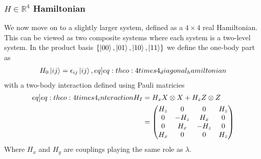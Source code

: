 \subsubsection{$H \in \mathbb{R}^4$ Hamiltonian}
We now move on to a slightly larger system, defined as a $4 \times 4$ real Hamiltonian. This can be viewed as two  composite systems where each system is a two-level system. In the product basis $\{\ket{00},\ket{01},\ket{10},\ket{11}\}$ we define the one-body part as 
\begin{align}
    H_0 \ket{ij} = \epsilon_{ij}\ket{ij}, \label[eq]{eq:theo:4times4_diagonal_hamiltonian}
\end{align}
with a two-body interaction defined using Pauli matricies
\begin{align}
    \begin{split} \label[eq]{eq:theo:4times4_interaction}
        H_I &= H_x X \otimes X + H_z Z \otimes Z \\
        &= \begin{pmatrix}
            H_z & 0 & 0 & H_z \\
            0 & - H_z & H_x & 0 \\
            0 & H_x & - H_z & 0 \\
            H_x & 0 & 0 & H_z
        \end{pmatrix}
    \end{split}
\end{align}
Where $H_x$ and $H_y$ are couplings playing the same role as $\lambda$.

